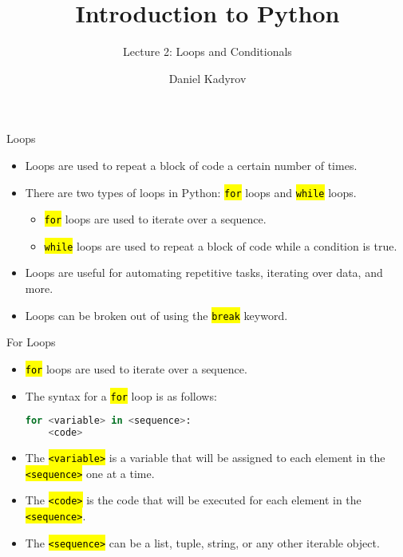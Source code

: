 \documentclass[
    aspectratio=169, 
    usepdftitle=false, 
    xcolor={dvipsnames},
    hyperref={
        colorlinks,
        linkcolor=black,
        urlcolor=blue}
    ]{beamer}
\title[Introduction to Python]{Introduction to Python}
\subtitle{Lecture 2: Loops and Conditionals}
\author{Daniel Kadyrov}
\date{}
\let\OldTexttt\texttt
\renewcommand{\texttt}[1]{\OldTexttt{\hl{#1}}}%
\begin{document}
\begin{frame}
    \titlepage
\end{frame}

\begin{frame}{Loops}
    \begin{itemize}
        \item Loops are used to repeat a block of code a certain number of times.
        \item There are two types of loops in Python: \texttt{for} loops and \texttt{while} loops.
        \begin{itemize}
            \item \texttt{for} loops are used to iterate over a sequence.
            \item \texttt{while} loops are used to repeat a block of code while a condition is true.
        \end{itemize}
        \item Loops are useful for automating repetitive tasks, iterating over data, and more.
        \item Loops can be broken out of using the \texttt{break} keyword.
    \end{itemize}
\end{frame}

\begin{frame}[fragile]{For Loops}
    \begin{itemize}
        \item \texttt{for} loops are used to iterate over a sequence.
        \item The syntax for a \texttt{for} loop is as follows:
        \begin{lstlisting}[language=Python]
for <variable> in <sequence>:
    <code>
        \end{lstlisting}
        \item The \texttt{<variable>} is a variable that will be assigned to each element in the \texttt{<sequence>} one at a time.
        \item The \texttt{<code>} is the code that will be executed for each element in the \texttt{<sequence>}.
        \item The \texttt{<sequence>} can be a list, tuple, string, or any other iterable object.
    \end{itemize}
\end{frame}
\end{document}
